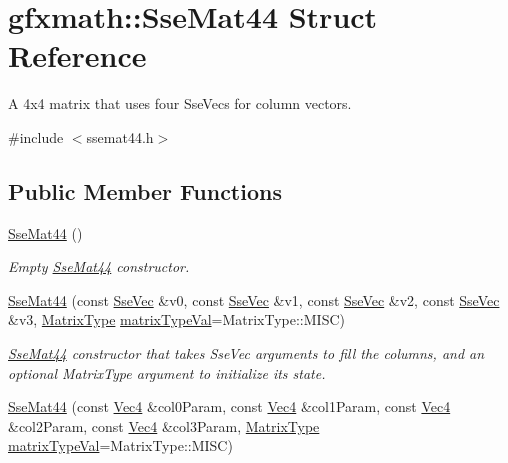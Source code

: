 \hypertarget{structgfxmath_1_1_sse_mat44}{}\section{gfxmath\+:\+:Sse\+Mat44 Struct Reference}
\label{structgfxmath_1_1_sse_mat44}


A 4x4 matrix that uses four Sse\+Vecs for column vectors.  




{\ttfamily \#include $<$ssemat44.\+h$>$}

\subsection*{Public Member Functions}
\begin{DoxyCompactItemize}
\item 
\hyperlink{structgfxmath_1_1_sse_mat44_aeee33533bcfdba675609d5b1155cf029}{Sse\+Mat44} ()
\begin{DoxyCompactList}\small\item\em Empty \hyperlink{structgfxmath_1_1_sse_mat44}{Sse\+Mat44} constructor. \end{DoxyCompactList}\item 
\hyperlink{structgfxmath_1_1_sse_mat44_a60f6b91adfec4810007c8bef96bca42c}{Sse\+Mat44} (const \hyperlink{namespacegfxmath_a0de2243e2b8d0fd46d3af5e036423004}{Sse\+Vec} \&v0, const \hyperlink{namespacegfxmath_a0de2243e2b8d0fd46d3af5e036423004}{Sse\+Vec} \&v1, const \hyperlink{namespacegfxmath_a0de2243e2b8d0fd46d3af5e036423004}{Sse\+Vec} \&v2, const \hyperlink{namespacegfxmath_a0de2243e2b8d0fd46d3af5e036423004}{Sse\+Vec} \&v3, \hyperlink{namespacegfxmath_a6c8951c82aec5015dd6806affb4c8d03}{Matrix\+Type} \hyperlink{structgfxmath_1_1_sse_mat44_abdcc4efbf8375bae103da12c0823a85c}{matrix\+Type\+Val}=Matrix\+Type\+::\+M\+I\+S\+C)
\begin{DoxyCompactList}\small\item\em \hyperlink{structgfxmath_1_1_sse_mat44}{Sse\+Mat44} constructor that takes Sse\+Vec arguments to fill the columns, and an optional Matrix\+Type argument to initialize its state. \end{DoxyCompactList}\item 
\hyperlink{structgfxmath_1_1_sse_mat44_a2fe0899f1f7a864586c5fb01397da259}{Sse\+Mat44} (const \hyperlink{structgfxmath_1_1_vec4}{Vec4} \&col0\+Param, const \hyperlink{structgfxmath_1_1_vec4}{Vec4} \&col1\+Param, const \hyperlink{structgfxmath_1_1_vec4}{Vec4} \&col2\+Param, const \hyperlink{structgfxmath_1_1_vec4}{Vec4} \&col3\+Param, \hyperlink{namespacegfxmath_a6c8951c82aec5015dd6806affb4c8d03}{Matrix\+Type} \hyperlink{structgfxmath_1_1_sse_mat44_abdcc4efbf8375bae103da12c0823a85c}{matrix\+Type\+Val}=Matrix\+Type\+::\+M\+I\+S\+C)

\end{DoxyCompactItemize}
